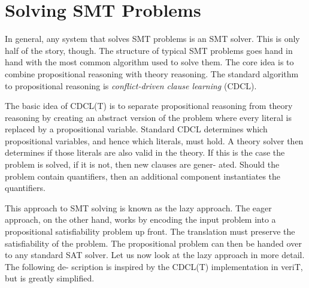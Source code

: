 \section{Solving SMT Problems}

In general, any system that solves SMT problems is an SMT solver. This is only half of the story, though.
The structure of typical SMT problems goes hand in hand with the most common algorithm used to solve them.
The core idea is to combine propositional reasoning with theory reasoning.
The standard algorithm to propositional reasoning is \textit{conflict-driven clause learning} (CDCL).


The basic idea of CDCL(T) is to separate propositional reasoning from
theory reasoning by creating an abstract version of the problem where every
literal is replaced by a propositional variable. Standard CDCL determines
which propositional variables, and hence which literals, must hold. A theory
solver then determines if those literals are also valid in the theory. If this
is the case the problem is solved, if it is not, then new clauses are gener-
ated. Should the problem contain quantifiers, then an additional component
instantiates the quantifiers.


This approach to SMT solving is known as the lazy approach. The eager
approach, on the other hand, works by encoding the input problem into a
propositional satisfiability problem up front. The translation must preserve
the satisfiability of the problem. The propositional problem can then be
handed over to any standard SAT solver.
Let us now look at the lazy approach in more detail. The following de-
scription is inspired by the CDCL(T) implementation in veriT, but is greatly
simplified.

